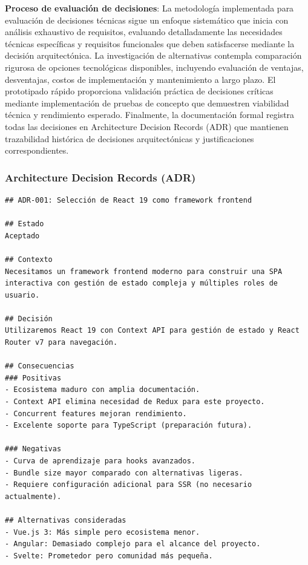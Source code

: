 \documentclass[12pt,a4paper,oneside]{report}
\begin{document}
\textbf{Proceso de evaluación de decisiones}: La metodología implementada para evaluación de decisiones técnicas sigue un enfoque sistemático que inicia con análisis exhaustivo de requisitos, evaluando detalladamente las necesidades técnicas específicas y requisitos funcionales que deben satisfacerse mediante la decisión arquitectónica. La investigación de alternativas contempla comparación rigurosa de opciones tecnológicas disponibles, incluyendo evaluación de ventajas, desventajas, costos de implementación y mantenimiento a largo plazo. El prototipado rápido proporciona validación práctica de decisiones críticas mediante implementación de pruebas de concepto que demuestren viabilidad técnica y rendimiento esperado. Finalmente, la documentación formal registra todas las decisiones en Architecture Decision Records (ADR) que mantienen trazabilidad histórica de decisiones arquitectónicas y justificaciones correspondientes.

\subsubsection{Architecture Decision Records
(ADR)}\label{architecture-decision-records-adr}

\begin{lstlisting}
## ADR-001: Selección de React 19 como framework frontend

## Estado
Aceptado

## Contexto
Necesitamos un framework frontend moderno para construir una SPA interactiva con gestión de estado compleja y múltiples roles de usuario.

## Decisión
Utilizaremos React 19 con Context API para gestión de estado y React Router v7 para navegación.

## Consecuencias
### Positivas
- Ecosistema maduro con amplia documentación.
- Context API elimina necesidad de Redux para este proyecto.
- Concurrent features mejoran rendimiento.
- Excelente soporte para TypeScript (preparación futura).

### Negativas
- Curva de aprendizaje para hooks avanzados.
- Bundle size mayor comparado con alternativas ligeras.
- Requiere configuración adicional para SSR (no necesario actualmente).

## Alternativas consideradas
- Vue.js 3: Más simple pero ecosistema menor.
- Angular: Demasiado complejo para el alcance del proyecto.
- Svelte: Prometedor pero comunidad más pequeña.
\end{lstlisting}
\end{document}
